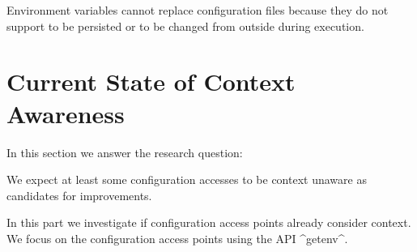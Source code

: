 Environment variables cannot replace configuration files because they do not support to be persisted or to be changed from outside during execution.




































































\section{Current State of Context Awareness}
\label{sec:context-awareness}

In this section we answer the research question:
\rqMotivationContext*

\begin{hypothesis}
We expect at least some configuration accesses to be context unaware as candidates for improvements.
\end{hypothesis}


\label{sec:context-context-usage}

In this part we investigate if configuration access points already consider context.
We focus on the configuration access points using the API ^getenv^.

